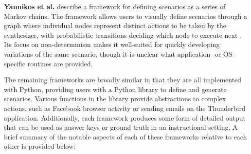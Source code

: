 \documentclass[letterpaper,12pt]{report}
\begin{document}
\textbf{Yannikos et al.} describe a framework for defining scenarios as
a series of Markov chains. The framework allows users to visually define
scenarios through a graph where individual nodes represent distinct
actions to be taken by the synthesizer, with probabilistic transitions
deciding which node to execute next
\cite{yannikosDataCorporaDigital2014}. Its focus on non-determinism
makes it well-suited for quickly developing variations of the same
scenario, though it is unclear what application- or OS-specific routines
are provided.

The remaining frameworks are broadly similar in that they are all
implemented with Python, providing users with a Python library to define
and generate scenarios. Various functions in the library provide
abstractions to complex actions, such as Facebook browser activity or
sending emails on the Thunderbird application. Additionally, each
framework produces some form of detailed output that can be used as
answer keys or ground truth in an instructional setting. A brief summary
of the notable aspects of each of these frameworks relative to each
other is provided below:
\end{document}
